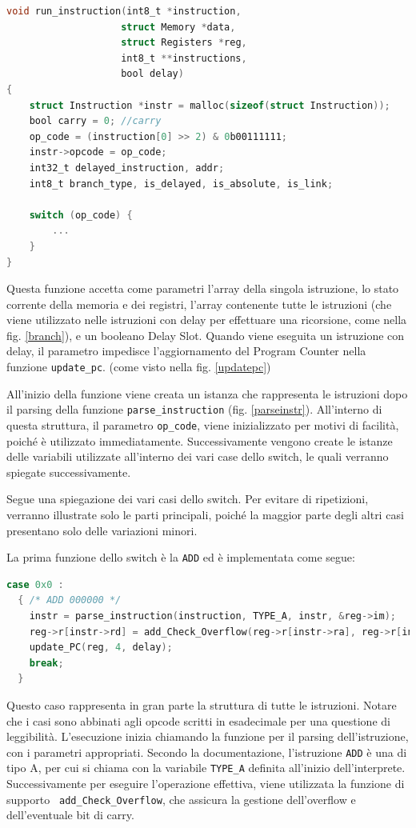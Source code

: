\begin{lstlisting}[language=C,caption={Run Instruction},label={runinstruction}]
void run_instruction(int8_t *instruction, 
                    struct Memory *data, 
                    struct Registers *reg, 
                    int8_t **instructions, 
                    bool delay)
{
	struct Instruction *instr = malloc(sizeof(struct Instruction));
	bool carry = 0; //carry
    op_code = (instruction[0] >> 2) & 0b00111111;
	instr->opcode = op_code;
	int32_t delayed_instruction, addr;
	int8_t branch_type, is_delayed, is_absolute, is_link;

	switch (op_code) {
		...
    }
}
\end{lstlisting}
Questa funzione accetta come parametri l’array della singola istruzione, lo stato corrente della memoria e dei registri, l'array contenente tutte le istruzioni (che viene utilizzato nelle istruzioni con delay per effettuare una ricorsione, come nella fig. \ref{branch}), e un booleano Delay Slot. Quando viene eseguita un istruzione con delay, il parametro impedisce l'aggiornamento del Program Counter nella funzione \texttt{update\_pc}. (come visto nella fig. \ref{updatepc})

\vspace{0.3cm}

All'inizio della funzione viene creata un istanza che rappresenta le istruzioni dopo il parsing della funzione \texttt{parse\_instruction} (fig. \ref{parseinstr}).
All'interno di questa struttura, il parametro \texttt{op\_code}, viene inizializzato per motivi di facilità, poiché è utilizzato immediatamente. Successivamente vengono create le istanze delle variabili utilizzate all'interno dei vari case dello switch, le quali verranno spiegate successivamente.

\vspace{0.3cm}

Segue una spiegazione dei vari casi dello switch. Per evitare di ripetizioni, verranno illustrate solo le parti principali, poiché la maggior parte degli altri casi presentano solo delle variazioni minori.

\vspace{0.3cm}

La prima funzione dello switch è la \texttt{ADD} ed è implementata come segue:
\begin{lstlisting}[language=C]
  case 0x0 : 
  { /* ADD 000000 */
    instr = parse_instruction(instruction, TYPE_A, instr, &reg->im);
    reg->r[instr->rd] = add_Check_Overflow(reg->r[instr->ra], reg->r[instr->rb], &carry);
    update_PC(reg, 4, delay);
    break;
  }
\end{lstlisting}
Questo caso rappresenta in gran parte la struttura di tutte le istruzioni. Notare che i casi sono abbinati agli opcode scritti in esadecimale per una questione di leggibilità. L'esecuzione inizia chiamando la funzione per il parsing dell'istruzione, con i parametri appropriati. Secondo la documentazione, l'istruzione \texttt{ADD} è una di tipo A, per cui si chiama con la variabile \texttt{TYPE\_A} definita all'inizio dell'interprete. Successivamente per eseguire l'operazione effettiva, viene utilizzata la funzione di supporto \texttt{ add\_Check\_Overflow}, che assicura la gestione dell'overflow e dell'eventuale bit di carry.

